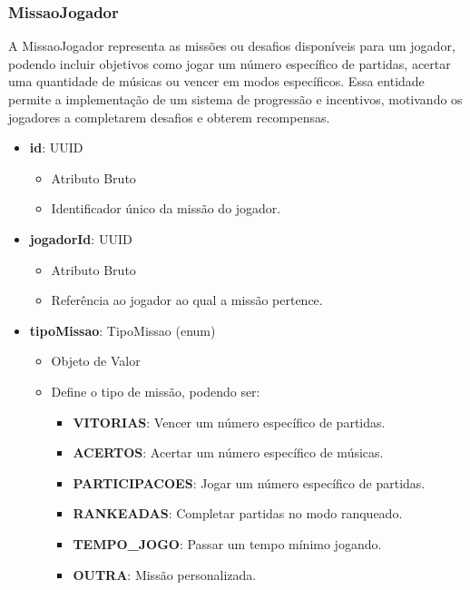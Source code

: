     \subsubsection{MissaoJogador}
    A MissaoJogador representa as missões ou desafios disponíveis para um jogador, podendo incluir objetivos como jogar um número específico de partidas, acertar uma quantidade de músicas ou vencer em modos específicos. Essa entidade permite a implementação de um sistema de progressão e incentivos, motivando os jogadores a completarem desafios e obterem recompensas.
    \begin{itemize}
        \item \textbf{id}: UUID  
              \begin{itemize}
                  \item Atributo Bruto
                  \item Identificador único da missão do jogador.
              \end{itemize}
    
        \item \textbf{jogadorId}: UUID  
              \begin{itemize}
                  \item Atributo Bruto
                  \item Referência ao jogador ao qual a missão pertence.
              \end{itemize}
    
        \item \textbf{tipoMissao}: TipoMissao (enum)  
              \begin{itemize}
                  \item Objeto de Valor
                  \item Define o tipo de missão, podendo ser:
                  \begin{itemize}
                      \item \textbf{VITORIAS}: Vencer um número específico de partidas.
                      \item \textbf{ACERTOS}: Acertar um número específico de músicas.
                      \item \textbf{PARTICIPACOES}: Jogar um número específico de partidas.
                      \item \textbf{RANKEADAS}: Completar partidas no modo ranqueado.
                      \item \textbf{TEMPO\_JOGO}: Passar um tempo mínimo jogando.
                      \item \textbf{OUTRA}: Missão personalizada.
                  \end{itemize}
              \end{itemize}
    

\end{itemize}
